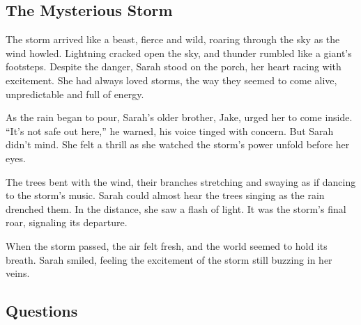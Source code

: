 \documentclass[12pt]{article}
\begin{document}
\onehalfspacing

\subsection*{The Mysterious Storm}

\begin{tcolorbox}[colframe=black!40, colback=gray!5]

\begin{spacing}{1.15}

The storm arrived like a beast, fierce and wild, roaring through the sky as the wind howled. Lightning cracked open the sky, and thunder rumbled like a giant’s footsteps. Despite the danger, Sarah stood on the porch, her heart racing with excitement. She had always loved storms, the way they seemed to come alive, unpredictable and full of energy.

As the rain began to pour, Sarah’s older brother, Jake, urged her to come inside. “It’s not safe out here,” he warned, his voice tinged with concern. But Sarah didn’t mind. She felt a thrill as she watched the storm’s power unfold before her eyes. 

The trees bent with the wind, their branches stretching and swaying as if dancing to the storm’s music. Sarah could almost hear the trees singing as the rain drenched them. In the distance, she saw a flash of light. It was the storm’s final roar, signaling its departure.

When the storm passed, the air felt fresh, and the world seemed to hold its breath. Sarah smiled, feeling the excitement of the storm still buzzing in her veins.

\end{spacing}

\end{tcolorbox}

\subsection*{Questions}
\end{document}
